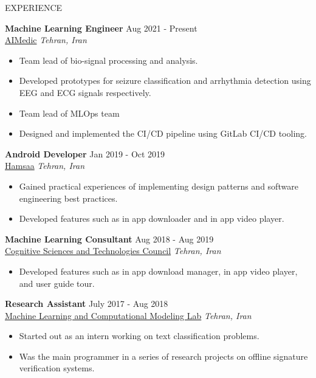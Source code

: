 \documentclass{resume} %
\begin{document}
	 \begin{rSection}{EXPERIENCE}
		
		\textbf{Machine Learning Engineer} \hfill Aug 2021 - Present\\
		\href{https://aimedic.co/}{AIMedic} \hfill \textit{Tehran, Iran}
		\begin{itemize}
			\item Team lead of bio-signal processing and analysis. 
			\item Developed prototypes for seizure classification and arrhythmia detection using EEG and ECG signals respectively.
			\item Team lead of MLOps team
			\item Designed and implemented the CI/CD pipeline using GitLab CI/CD tooling.

		\end{itemize}
		\vspace{3pt}
		\textbf{Android Developer} \hfill Jan 2019 - Oct 2019\\
		\href{https://hamsaa.ir/}{Hamsaa} \hfill \textit{Tehran, Iran}
		\begin{itemize}
			\item Gained practical experiences of implementing design patterns and software engineering best practices.
			\item Developed features such as in app downloader and in app video player.
		\end{itemize}
		\vspace{3pt}
		\textbf{Machine Learning Consultant} \hfill Aug 2018 - Aug 2019\\
		\href{https://cogc.ir/?lang=2}{Cognitive Sciences and Technologies Council}
		\hfill \textit{Tehran, Iran}
		\begin{itemize}
			\item Developed features such as in app download manager, in app video player, and user guide tour.
		\end{itemize}
		\vspace{3pt}
		\textbf{Research Assistant} \hfill July 2017 - Aug 2018\\
		\href{http://mlcm.ut.ac.ir/}{Machine Learning and Computational Modeling Lab} \hfill \textit{Tehran, Iran}
		\begin{itemize}
			\item Started out as an intern working on text classification problems.
			\item Was the main programmer in a series of research projects on offline signature verification systems.
		\end{itemize}
		
	\end{rSection} 
	
\end{document}
